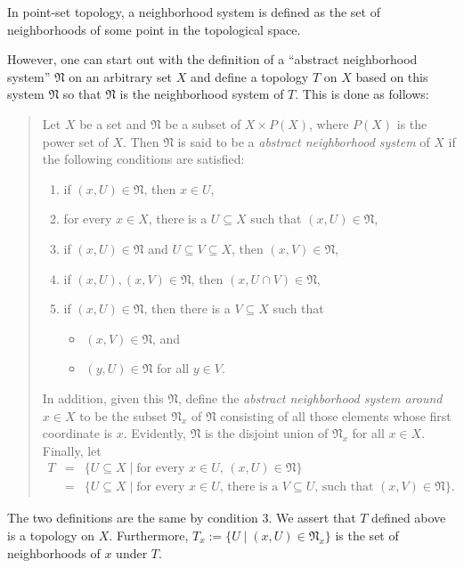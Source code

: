 \documentclass[12pt]{article}
\begin{document}
In point-set topology, a neighborhood system is defined as the set of neighborhoods of some point in the topological space.

However, one can start out with the definition of a ``abstract neighborhood system'' $\mathfrak{N}$ on an arbitrary set $X$ and define a topology $T$ on $X$ based on this system $\mathfrak{N}$ so that $\mathfrak{N}$ is the neighborhood system of $T$.  This is done as follows:

\begin{quote}
Let $X$ be a set and $\mathfrak{N}$ be a subset of $X\times P(X)$, where $P(X)$ is the power set of $X$.  Then $\mathfrak{N}$ is said to be a \emph{abstract neighborhood system} of $X$ if the following conditions are satisfied:
\begin{enumerate}
\item if $(x,U)\in \mathfrak{N}$, then $x\in U$,
\item for every $x\in X$, there is a $U\subseteq X$ such that $(x,U)\in \mathfrak{N}$,
\item if $(x,U)\in \mathfrak{N}$ and $U\subseteq V\subseteq X$, then $(x,V)\in \mathfrak{N}$,
\item if $(x,U),(x,V)\in \mathfrak{N}$, then $(x,U\cap V)\in \mathfrak{N}$,
\item if $(x,U)\in \mathfrak{N}$, then there is a $V\subseteq X$ such that 
\begin{itemize}
\item $(x,V)\in \mathfrak{N}$, and
\item $(y,U)\in \mathfrak{N}$ for all $y\in V$.
\end{itemize}
\end{enumerate}
In addition, given this $\mathfrak{N}$, define the \emph{abstract neighborhood system around} $x\in X$ to be the subset $\mathfrak{N}_x$ of $\mathfrak{N}$ consisting of all those elements whose first coordinate is $x$.  Evidently, $\mathfrak{N}$ is the disjoint union of $\mathfrak{N}_x$ for all $x\in X$.  Finally, let 
\begin{eqnarray*}
T &=& \lbrace U\subseteq X\mid \mbox{for every }x\in U\mbox{, }(x,U)\in \mathfrak{N} \rbrace \\
&=& \lbrace U\subseteq X\mid \mbox{for every }x\in U\mbox{, there is a }V\subseteq U\mbox{, such that }(x,V)\in \mathfrak{N} \rbrace.
\end{eqnarray*}
\end{quote}
The two definitions are the same by condition 3.  We assert that $T$ defined above is a topology on $X$.  Furthermore, $T_x:=\lbrace U\mid (x,U)\in \mathfrak{N}_x \rbrace$ is the set of neighborhoods of $x$ under $T$.
\end{document}
